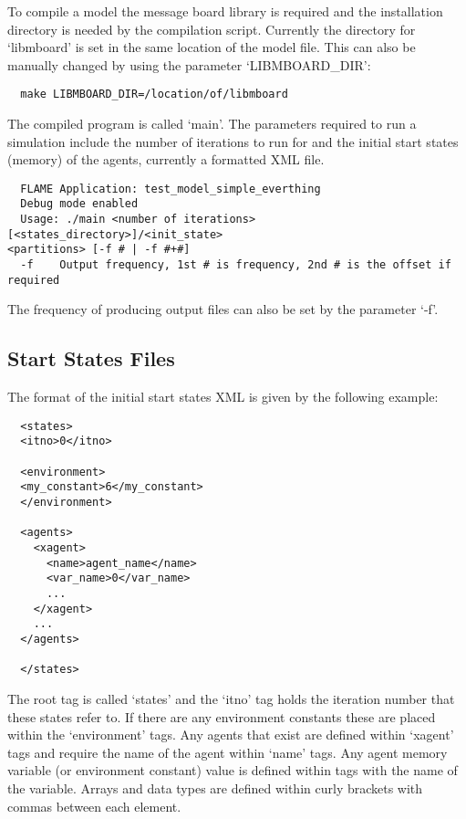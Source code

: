 To compile a model the message board library is required and the installation
directory is needed by the compilation script. Currently the directory for
`libmboard' is set in the same location of the model file. This can also be
manually changed by using the parameter `LIBMBOARD\_DIR':

\begin{verbatim}
  make LIBMBOARD_DIR=/location/of/libmboard
\end{verbatim}

The compiled program is called `main'. The parameters required to run a
simulation include the number of iterations to run for and the initial start
states (memory) of the agents, currently a formatted XML file.

\begin{verbatim}
  FLAME Application: test_model_simple_everthing 
  Debug mode enabled 
  Usage: ./main <number of iterations> [<states_directory>]/<init_state>
<partitions> [-f # | -f #+#]
  -f	Output frequency, 1st # is frequency, 2nd # is the offset if required
\end{verbatim}

The frequency of producing output files can also be set by the parameter `-f'.

\subsection{Start States Files}

The format of the initial start states XML is given by the following example:

\begin{verbatim}
  <states>
  <itno>0</itno>
  
  <environment>
  <my_constant>6</my_constant>
  </environment>
  
  <agents>
    <xagent>
      <name>agent_name</name>
      <var_name>0</var_name>
      ...
    </xagent>
    ...
  </agents>

  </states>
\end{verbatim}

The root tag is called `states' and the `itno' tag holds the iteration number
that these states refer to. If there are any environment constants these are
placed within the `environment' tags. Any agents that exist are defined within
`xagent' tags and require the name of the agent within `name' tags. Any agent
memory variable (or environment constant) value is defined within tags with
the name of the variable. Arrays and data types are defined within curly
brackets with commas between each element.

